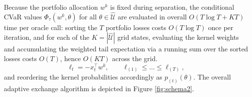 \documentclass[smallextended]{svjour3}
\begin{document}
Because the portfolio allocation $w^k$ is fixed during separation, the conditional CVaR values $\Phi_\tau(w^k,\theta)$ for all $\theta\in\widehat{\mathcal{U}}$ are evaluated in overall $O(T\log T + KT)$ time per oracle call: sorting the $T$ portfolio losses costs $O(T\log T)$ once per iteration, and for each of the $K = |\widehat{\mathcal{U}}|$ grid states, evaluating the kernel weights and accumulating the weighted tail expectation via a running sum over the sorted losses costs $O(T)$, hence $O(KT)$ across the grid.
\begin{equation}
\ell_t = -x_t^\top w^k,\qquad \ell_{(1)} \le \dots \le \ell_{(T)},
\end{equation}
and reordering the kernel probabilities accordingly as $p_{(t)}(\theta)$.
The overall adaptive exchange algorithm is depicted in Figure \ref{fig:schema2}.
\end{document}
